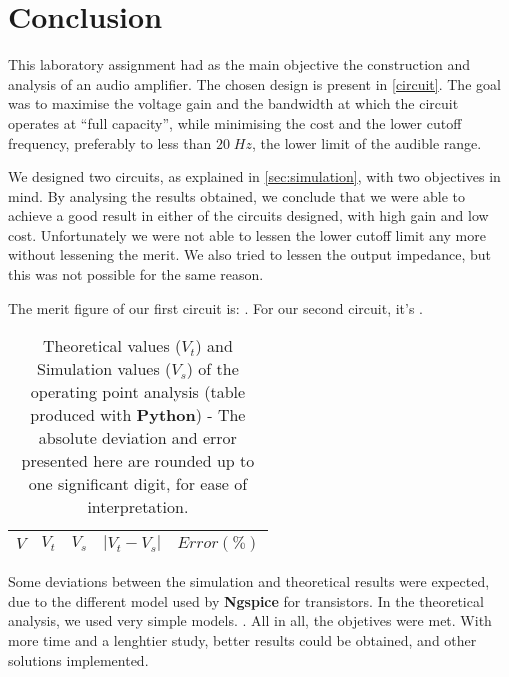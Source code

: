\section{Conclusion}
\label{sec:conclusion}

This laboratory assignment had as the main objective the construction and analysis of an audio amplifier. The chosen design is present in \ref{circuit}. The goal was to maximise the voltage gain and the bandwidth at which the circuit operates at ``full capacity'', while minimising the cost and the lower cutoff frequency, preferably to less than $20\;Hz$, the lower limit of the audible range.

We designed two circuits, as explained in \ref{sec:simulation}, with two objectives in mind. By analysing the results obtained, we conclude that we were able to achieve a good result in either of the circuits designed, with high gain and low cost. Unfortunately we were not able to lessen the lower cutoff limit any more without lessening the merit. We also tried to lessen the output impedance, but this was not possible for the same reason.

The merit figure of our first circuit is: . For our second circuit, it's .


\begin{table}[H]
  \centering
  \begin{tabular}{|c|c|c|c|c|}
    \hline
        $V$ & $V_t$ & $V_s$ & $|V_t-V_s|$ & $Error (\%)$ \\
        \hline
        \hline
        
        \hline
  \end{tabular}
  \caption{Theoretical values ($V_t$) and Simulation values ($V_s$) of the operating point analysis (table produced with {\bf Python})  - The absolute deviation and error presented here are rounded up to one significant digit, for ease of interpretation.}
  \label{error1_res}
\end{table}


Some deviations between the simulation and theoretical results were expected, due to the different model used by {\bf Ngspice} for transistors. In the theoretical analysis, we used very simple models.
. 
All in all, the objetives were met. With more time and a lenghtier study, better results could be obtained, and other solutions implemented.

